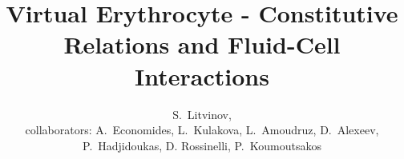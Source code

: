 \author[Litvinov]
{S.~Litvinov, \\
collaborators: A.~Economides, L.~Kulakova, L.~Amoudruz, D.~Alexeev, P.~Hadjidoukas, D. Rossinelli, P.~Koumoutsakos}
\title[Virtual Erythrocyte]{Virtual Erythrocyte - Constitutive Relations and Fluid-Cell Interactions}
\date{}
